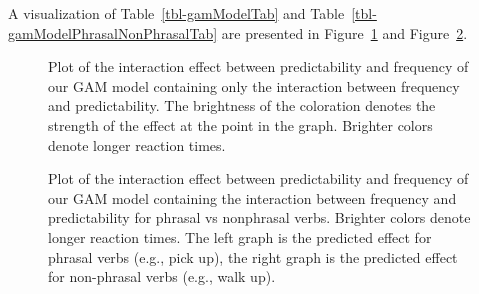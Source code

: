 \documentclass[
  authoryear,
  preprint,
  1p,
  onecolumn]{elsarticle}
\begin{document}
A visualization of Table~\ref{tbl-gamModelTab} and
Table~\ref{tbl-gamModelPhrasalNonPhrasalTab} are presented in
Figure~\ref{fig-gam2dplot1} and Figure~\ref{fig-gam2dplot2}.

\begin{figure}


\caption{\label{fig-gam2dplot1}Plot of the interaction effect between
predictability and frequency of our GAM model containing only the
interaction between frequency and predictability. The brightness of the
coloration denotes the strength of the effect at the point in the graph.
Brighter colors denote longer reaction times.}

\end{figure}%

\begin{figure}


\caption{\label{fig-gam2dplot2}Plot of the interaction effect between
predictability and frequency of our GAM model containing the interaction
between frequency and predictability for phrasal vs nonphrasal verbs.
Brighter colors denote longer reaction times. The left graph is the
predicted effect for phrasal verbs (e.g., pick up), the right graph is
the predicted effect for non-phrasal verbs (e.g., walk up).}

\end{figure}%
\end{document}
